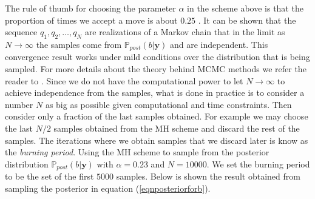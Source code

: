 \documentclass[12pt]{book}
\newcommand{\post}{\mathbb{P}_{post}}
\newcommand{\y}{\textbf{y}}
\begin{document}
The rule of thumb for choosing the parameter $\alpha$ in the scheme above is that   the proportion of times we accept
a move 
is about $0.25$ \cite{casella2008monte}. It can be shown that the sequence $q_{1},q_{2},\ldots,q_{N}$
are realizations of a Markov chain that in the limit as $N\rightarrow\infty$ the samples come from
$\post(b|\y)$ and are independent. This convergence result works under mild conditions over the distribution that is being sampled.
For more details about the theory behind MCMC methods we refer the reader to \cite{casella2008monte}. 
Since we do not have the computational power to let $N\rightarrow\infty$
to achieve independence from the samples, what is done in practice is to consider a number $N$ as big as possible given computational and time constraints. 
Then consider only 
a fraction of the last  samples obtained. For example we may choose the last $N/2$ samples obtained from the MH scheme and 
discard the rest of the samples. The iterations where we obtain samples that we discard later is know as 
the \textit{burning period}.
\newline
Using the MH scheme to sample from the posterior distribution $\post(b|\y)$ with $\alpha=0.23$
and $N=10000$. We set the burning period to be the set  of the first $5000$ samples. Below is shown the result obtained
from sampling the posterior in equation (\ref{eqnposteriorforb}).

%
\end{document}
